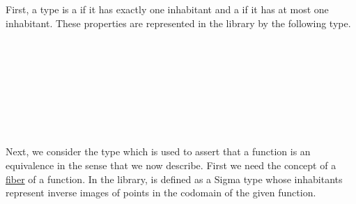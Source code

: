 First, a type is a  if it has exactly one inhabitant and a  if it has at most one inhabitant. These properties are represented in the \typetopology library by the following type.
\ccpad
\begin{code}%
\>[1]\AgdaSpace{}%
\AgdaSymbol{:}\AgdaSpace{}%
\AgdaSymbol{(}\AgdaSpace{}%
\AgdaSymbol{:}\AgdaSpace{}%
\AgdaSpace{}%
\AgdaSpace{}%
\AgdaSymbol{)}\AgdaSpace{}%
\AgdaSpace{}%
\AgdaSpace{}%
\AgdaSpace{}%
\AgdaSpace{}%
\<%
\\
%
\>[1]\AgdaSpace{}%
\AgdaSpace{}%
\AgdaSpace{}%
\AgdaSymbol{=}\AgdaSpace{}%
\AgdaSymbol{(}\AgdaSpace{}%
\AgdaSymbol{:}\AgdaSpace{}%
\AgdaSymbol{)}\AgdaSpace{}%
\AgdaSpace{}%
\AgdaSpace{}%
\AgdaSpace{}%
\<%
\\
%
\\[\AgdaEmptyExtraSkip]%
%
\>[1]\AgdaSpace{}%
\AgdaSymbol{:}\AgdaSpace{}%
\AgdaSpace{}%
\AgdaSpace{}%
\AgdaSpace{}%
\AgdaSpace{}%
\<%
\\
%
\>[1]\AgdaSpace{}%
\AgdaSpace{}%
\AgdaSymbol{=}\AgdaSpace{}%
\AgdaSpace{}%
\AgdaSpace{}%
\AgdaSpace{}%
\AgdaSpace{}%
\AgdaFunction{,}\AgdaSpace{}%
\AgdaSpace{}%
\AgdaSpace{}%
\<%
\\
%
\\[\AgdaEmptyExtraSkip]%
%
\>[1]\AgdaSpace{}%
\AgdaSymbol{:}\AgdaSpace{}%
\AgdaSpace{}%
\AgdaSpace{}%
\AgdaSpace{}%
\AgdaSpace{}%
\<%
\\
%
\>[1]\AgdaSpace{}%
\AgdaSpace{}%
\AgdaSymbol{=}\AgdaSpace{}%
\AgdaSymbol{(}\AgdaSpace{}%
\AgdaSpace{}%
\AgdaSymbol{:}\AgdaSpace{}%
\AgdaSymbol{)}\AgdaSpace{}%
\AgdaSpace{}%
\AgdaSpace{}%
\AgdaSpace{}%
\<%
\end{code}
\ccpad
Next, we consider the type  which is used to assert that a function is an equivalence in the sense that we now describe. First we need the concept of a \href{https://ncatlab.org/nlab/show/fiber}{fiber} of a function. In the \typetopology library,  is defined as a Sigma type whose inhabitants represent inverse images of points in the codomain of the given function.
